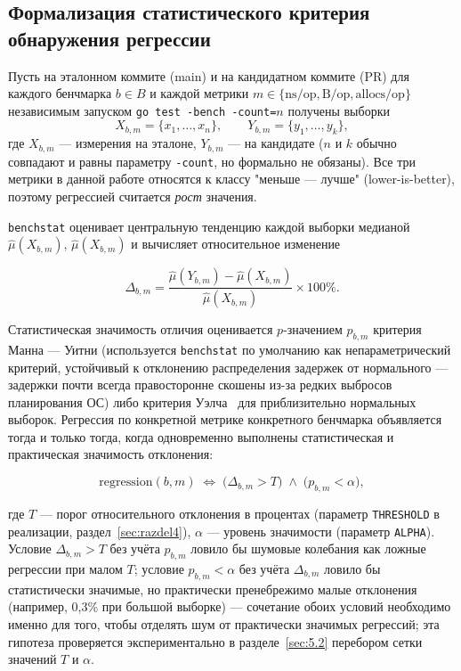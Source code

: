 \subsection{Формализация статистического критерия обнаружения регрессии}
\label{sec:2.2}

Пусть на эталонном коммите (main) и на кандидатном коммите (PR) для каждого
бенчмарка $b \in B$ и каждой метрики $m \in \{\text{ns/op}, \text{B/op},
\text{allocs/op}\}$ независимым запуском \texttt{go test -bench -count=$n$}
получены выборки
$$
X_{b,m} = \{x_1, \dots, x_n\}, \qquad Y_{b,m} = \{y_1, \dots, y_k\},
$$
где $X_{b,m}$ — измерения на эталоне, $Y_{b,m}$ — на кандидате
($n$ и $k$ обычно совпадают и равны параметру \texttt{-count}, но формально
не обязаны). Все три метрики в данной работе относятся к классу
"меньше — лучше" (lower-is-better), поэтому регрессией считается
\emph{рост} значения.

\texttt{benchstat} оценивает центральную тенденцию каждой выборки медианой
$\hat\mu(X_{b,m})$, $\hat\mu(X_{b,m})$ и вычисляет относительное изменение

\begin{equation}
\Delta_{b,m} = \frac{\hat\mu(Y_{b,m}) - \hat\mu(X_{b,m})}{\hat\mu(X_{b,m})} \times 100\%.
\label{eq:delta}
\end{equation}

Статистическая значимость отличия оценивается $p$-значением
$p_{b,m}$ критерия Манна --- Уитни (используется \texttt{benchstat} по
умолчанию как непараметрический критерий, устойчивый к отклонению
распределения задержек от нормального — задержки почти всегда
правосторонне скошены из-за редких выбросов планирования ОС) либо критерия
Уэлча~\cite{welch1947} для приблизительно нормальных выборок. Регрессия по
конкретной метрике конкретного бенчмарка объявляется тогда и только тогда,
когда одновременно выполнены статистическая и практическая значимость
отклонения:

\begin{equation}
\mathrm{regression}(b, m) \;\Longleftrightarrow\; \bigl(\Delta_{b,m} > T\bigr) \;\wedge\; \bigl(p_{b,m} < \alpha\bigr),
\label{eq:criterion}
\end{equation}

где $T$ — порог относительного отклонения в процентах (параметр
\texttt{THRESHOLD} в реализации, раздел~\ref{sec:razdel4}), $\alpha$ —
уровень значимости (параметр \texttt{ALPHA}). Условие $\Delta_{b,m} > T$
без учёта $p_{b,m}$ ловило бы шумовые колебания как ложные регрессии при
малом $T$; условие $p_{b,m} < \alpha$ без учёта $\Delta_{b,m}$ ловило бы
статистически значимые, но практически пренебрежимо малые отклонения
(например, 0,3\% при большой выборке) — сочетание обоих условий необходимо
именно для того, чтобы отделять шум от практически значимых регрессий; эта
гипотеза проверяется экспериментально в разделе~\ref{sec:5.2} перебором
сетки значений $T$ и $\alpha$.

